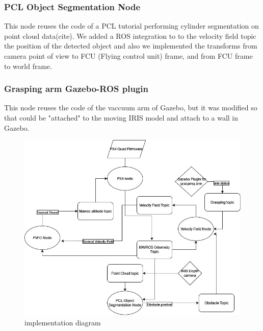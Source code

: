 \subsubsection{PCL Object Segmentation Node}
This node reuses the code of a PCL tutorial performing cylinder segmentation on point cloud data(cite). We added a ROS integration to to the velocity field topic the position of the detected object and also we implemented the transforms from camera point of view to FCU (Flying control unit) frame, and from FCU frame to world frame. 
\subsubsection{Grasping arm Gazebo-ROS plugin}    
This node reuses the code of the vaccuum arm of Gazebo, but it was modified so that could be "attached" to the moving IRIS model and attach to a wall in Gazebo. 

\begin{figure}[h!]
    \centering
    \includegraphics[width=\linewidth]{Images/implementation diagram.jpg}
    \caption{implementation diagram}
    \label{fig:implementationdiagram}
\end{figure}

